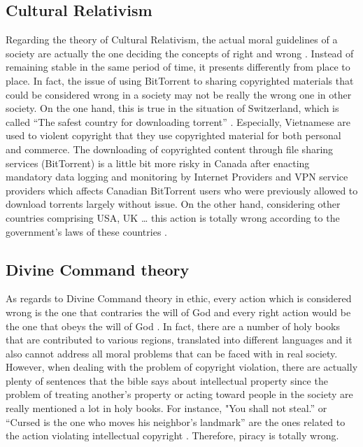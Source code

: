 \documentclass[conference]{IEEEtran}
\begin{document}
\subsection{Cultural Relativism}
Regarding the theory of Cultural Relativism, the actual moral guidelines of a society are actually the one deciding the concepts of right and wrong \cite{quinn2014ethics}. Instead of remaining stable in the same period of time, it presents differently from place to place. In fact, the issue of using BitTorrent to sharing copyrighted materials that could be considered wrong in a society may not be really the wrong one in other society. On the one hand, this is true in the situation of Switzerland, which is called “The safest country for downloading torrent” \cite{safesttorrent}. Especially, Vietnamese are used to violent copyright that they use copyrighted material for both personal and commerce. The downloading of copyrighted content through file sharing services (BitTorrent) is a little bit more risky in Canada after enacting mandatory data logging and monitoring by Internet Providers and VPN service providers which affects Canadian BitTorrent users who were previously allowed to download torrents largely without issue\cite{canadadataretention}.  On the other hand, considering other countries comprising USA, UK … this action is totally wrong according to the government's laws of these countries \cite{copyrightlawusa}.


\subsection{Divine Command theory}
As regards to Divine Command theory in ethic, every action which is considered wrong is the one that
contraries the will of God and every right action would be the one that obeys the will of God \cite{quinn2014ethics}. In fact, there are a number of holy books that are contributed to various regions, translated into different languages and it also cannot address all moral problems that can be faced with in real society. However, when dealing with the problem of copyright violation, there are actually plenty of sentences that the bible says about intellectual property since the problem of treating another's property or acting toward people in the society are really mentioned a lot in holy books. For instance, "You shall not steal.” \cite{exodus2015} or “Cursed is the one who moves his neighbor's landmark”\cite{deuteronomy2717} are the ones related to the action violating intellectual copyright \cite{bibleip}. Therefore,  piracy is totally wrong.
\end{document}
